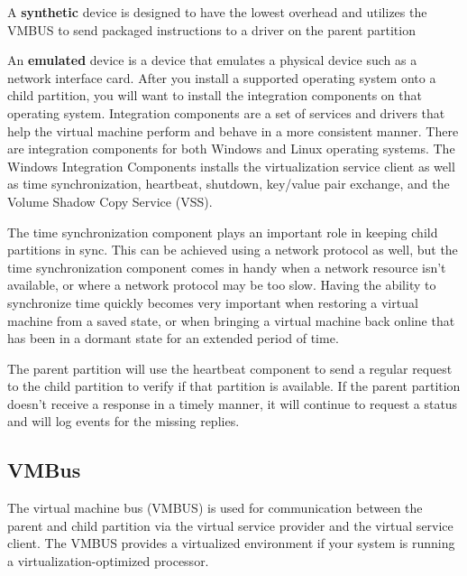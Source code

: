 \vspace{5mm}
A \textbf{synthetic} device is designed to have the lowest overhead and utilizes the VMBUS to send packaged instructions to a driver on the parent partition

\vspace{5mm}
An \textbf{emulated} device is a device that emulates a physical device such as a network interface card. After you install a supported operating system onto a child partition, 
you will want to install the integration components on that operating system. Integration components are a set of services and drivers that help the virtual machine perform and behave 
in a more consistent manner. There are integration components for both Windows and Linux operating systems. The Windows Integration Components installs the virtualization service client 
as well as time synchronization, heartbeat, shutdown, key/value pair exchange, and the Volume Shadow Copy Service (VSS).

\vspace{5mm}
The time synchronization component plays an important role in keeping child partitions in sync. This can be achieved using a network protocol as well, but the time synchronization component comes in handy when a network resource isn’t available, or where a network protocol may be too slow. Having the ability to synchronize time quickly becomes
very important when restoring a virtual machine from a saved state, or when bringing a virtual machine back online that has been in a dormant state for an extended period of time.

\vspace{5mm}
The parent partition will use the heartbeat component to send a regular request to the child partition to verify if that partition is available. If the parent partition doesn’t
receive a response in a timely manner, it will continue to request a status and will log
events for the missing replies.

\vspace{5mm}
\subsection{VMBus}
\vspace{5mm}

The virtual machine bus (VMBUS) \cite{BOOK:2} is used for communication between the parent and child partition via the virtual service provider and the virtual service client. The VMBUS
provides a virtualized environment if your system is running a virtualization-optimized processor.

